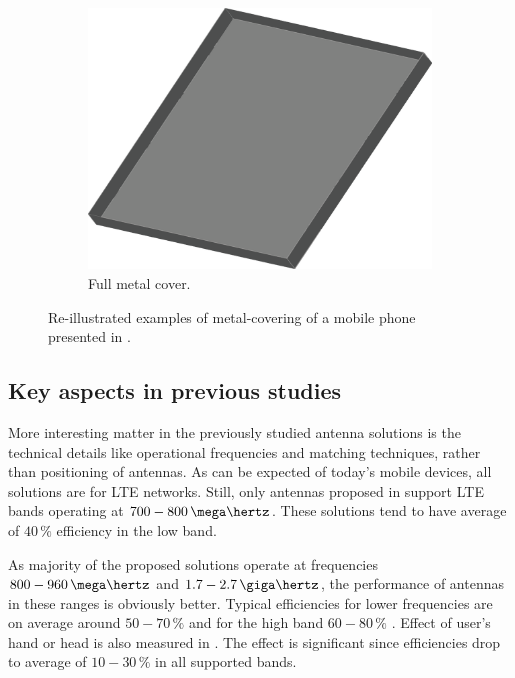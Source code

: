 \begin{figure}[H]
\begin{subfigure}[b]{0.3\textwidth}
        \includegraphics[width=\textwidth]{img/metal_cover_full.eps}
        \caption{Full metal cover.}
        \label{fig:full_cover}
    \end{subfigure}
    \caption{Re-illustrated examples of metal-covering of a mobile phone presented in \cite{chen_compact_lte}.}
    \label{fig:metal_covers}
\end{figure}



\subsection{Key aspects in previous studies}
\label{sec:key_aspects}
More interesting matter in the previously studied antenna solutions is the technical details like operational frequencies and matching techniques, rather than positioning of antennas. As can be expected of today's mobile devices, all solutions are for LTE networks. Still, only antennas proposed in \cite{stanley_lte_mimo, son_wideband_mimo, chen_compact_lte, chen_metal_frame,valkonen_multifeed} support LTE bands operating at $700-800\,\mega\hertz$. These solutions tend to have average of $40\,\%$ efficiency in the low band. 

As majority of the proposed solutions operate at frequencies $800-960\,\mega\hertz$ and $1.7-2.7\,\giga\hertz$, the performance of antennas in these ranges is obviously better. Typical efficiencies for lower frequencies are on average around $50-70\,\%$ and for the high band $60-80\,\%$ \cite{ban_dual_loop,chen_compact_lte,son_wideband_mimo,chen_metal_frame,zhong_pier}. Effect of user's hand or head is also measured in \cite{zhong_pier, chen_metal_frame,ban_dual_loop,reconf_narrow,hybrid,hepta_ifa}. The effect is significant since efficiencies drop to average of $10-30\,\%$ in all supported bands. 

